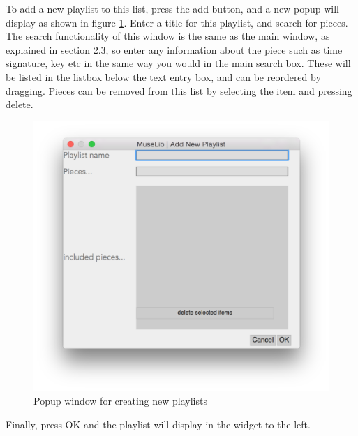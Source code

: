 To add a new playlist to this list, press the add button, and a new popup will display as shown in figure \ref{fig:newplaylist}. Enter a title for this playlist, and search for pieces. The search functionality of this window is the same as the main window, as explained in section 2.3, so enter any information about the piece such as time signature, key etc in the same way you would in the main search box. These will be listed in the listbox below the text entry box, and can be reordered by dragging. Pieces can be removed from this list by selecting the item and pressing delete.
\begin{figure}[H]
\centering
\includegraphics[width=\textwidth]{playlistpop}
\caption{Popup window for creating new playlists}
\label{fig:newplaylist}	
\end{figure}
Finally, press OK and the playlist will display in the widget to the left.

